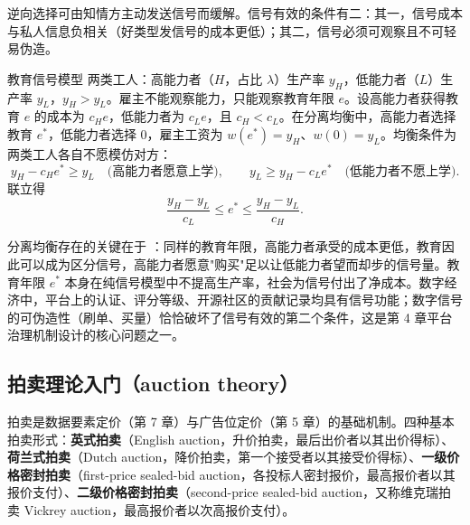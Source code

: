 逆向选择可由知情方主动发送信号而缓解。信号有效的条件有二：其一，信号成本与私人信息负相关（好类型发信号的成本更低）；其二，信号必须可观察且不可轻易伪造。

\begin{derivation}{教育信号模型}{}
两类工人：高能力者（$H$，占比 $\lambda$）生产率 $y_H$，低能力者（$L$）生产率 $y_L$，$y_H > y_L$。雇主不能观察能力，只能观察教育年限 $e$。设高能力者获得教育 $e$ 的成本为 $c_H e$，低能力者为 $c_L e$，且 $c_H < c_L$。在分离均衡中，高能力者选择教育 $e^*$，低能力者选择 $0$，雇主工资为 $w(e^*) = y_H$、$w(0) = y_L$。均衡条件为两类工人各自不愿模仿对方：
\[
y_H - c_H e^* \geq y_L \quad\text{(高能力者愿意上学)}, \qquad
y_L \geq y_H - c_L e^* \quad\text{(低能力者不愿上学)}.
\]
联立得
\[
\frac{y_H - y_L}{c_L} \leq e^* \leq \frac{y_H - y_L}{c_H}.
\]
\end{derivation}

分离均衡存在的关键在于 ：同样的教育年限，高能力者承受的成本更低，教育因此可以成为区分信号，高能力者愿意"购买"足以让低能力者望而却步的信号量。教育年限 $e^*$ 本身在纯信号模型中不提高生产率，社会为信号付出了净成本。数字经济中，平台上的认证、评分等级、开源社区的贡献记录均具有信号功能；数字信号的可伪造性（刷单、买量）恰恰破坏了信号有效的第二个条件，这是第 4 章平台治理机制设计的核心问题之一。
\subsection{拍卖理论入门（auction theory）}

拍卖是数据要素定价（第 7 章）与广告位定价（第 5 章）的基础机制。四种基本拍卖形式：\textbf{英式拍卖}（English auction，升价拍卖，最后出价者以其出价得标）、\textbf{荷兰式拍卖}（Dutch auction，降价拍卖，第一个接受者以其接受价得标）、\textbf{一级价格密封拍卖}（first-price sealed-bid auction，各投标人密封报价，最高报价者以其报价支付）、\textbf{二级价格密封拍卖}（second-price sealed-bid auction，又称维克瑞拍卖 Vickrey auction，最高报价者以次高报价支付）。


